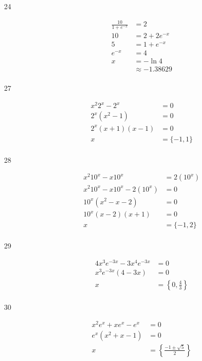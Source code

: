 \documentclass{exam}
\begin{document}
\begin{description}
      \item[24]
        \begin{align*}
          \frac{10}{1 + e^{-x}} &= 2 \\
          10                    &= 2 + 2e^{-x} \\
          5                     &= 1 + e^{-x} \\
          e^{-x}                &= 4 \\
          x                     &= -\ln 4 \\
                                &\approx \boxed{-1.38629} \\
        \end{align*}

      \item[27]
        \begin{align*}
          x^2 2^x - 2^x              &= 0 \\
          2^x \left( x^2 - 1 \right) &= 0 \\
          2^x(x + 1)(x - 1)          &= 0 \\
          x                          &= \boxed{ \{ -1, 1 \} } \\
        \end{align*}

      \item[28]
        \begin{align*}
          x^2 10^x - x 10^x           &= 2(10^x) \\
          x^2 10^x - x 10^x - 2(10^x) &= 0 \\
           10^x (x^2  - x  - 2)       &= 0 \\
           10^x (x - 2)(x + 1)        &= 0 \\
          x                           &= \boxed{ \{ -1, 2 \} } \\
        \end{align*}

      \item[29]
        \begin{align*}
          4x^3 e^{-3x} - 3x^4e^{-3x}        &= 0 \\
          x^3 e^{-3x} \left( 4 - 3x \right) &= 0 \\
          x                                 &= \boxed{ \left\{ 0, \frac{4}{3} \right\} } \\
        \end{align*}

      \item[30]
        \begin{align*}
          x^2e^x + xe^x - e^x            &= 0 \\
          e^x \left( x^2 + x - 1 \right) &= 0 \\
          x                              &= \boxed{ \left\{ \frac{ - 1 \pm \sqrt{5}}{2} \right\} } \\
        \end{align*}


\end{description}
\end{document}
